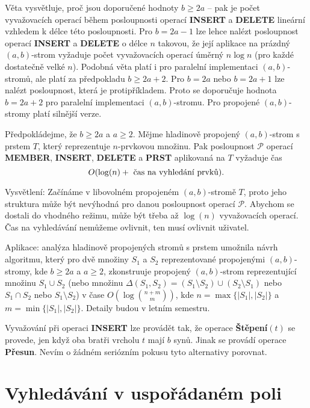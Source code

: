 \documentclass[a4paper,12pt]{article}
\begin{document}
Věta vysvětluje, proč jsou doporučené hodnoty $
b\ge 2a$ -- 
pak je počet vyvažovacích ope\-rací během posloupnosti 
operací {\bf INSERT} a {\bf DELETE} lineární vzhledem k délce 
této posloupnosti. Pro $b=2a-1$ lze lehce nalézt 
posloupnost operací {\bf INSERT} a {\bf DELETE} o délce $n$ takovou, 
že její aplikace na prázdný $(a,b)$-strom vyžaduje počet 
vyvažovacích operací ú\-měrný $n\log n$ (pro každé 
dostatečně velké $n$). Podobná věta platí i pro paralelní 
implementaci $(a,b)$-stromů, ale platí za 
předpokladu $b\ge 2a+2$. Pro $b=2a$ nebo $b=2a+1$ lze 
nalézt posloupnost, která je protipříkladem. Proto se 
doporučuje hodnota $b=2a+2$ pro paralelní implementaci 
$(a,b)$-stromu. Pro propojené $(a,b)$-stromy platí silnější 
verze.

\begin{veta}Předpokládejme, že $b\ge 2a$ a $a\ge 2$. Mějme 
hladinově propojený $(a,b)$-strom s prstem $T$, který reprezentuje 
$n$-prvkovou množinu. Pak posloupnost $\mathcal P$ operací {\bf MEMBER},
{\bf INSERT}, {\bf DELETE} a {\bf PRST} aplikovaná na $T$ vyžaduje čas 
$$O(\log(n)+\text{\rm\ čas na vyhledání prvků})
.$$
\end{veta}

Vysvětlení: Začínáme v libovolném 
propojeném $(a,b)$-stro\-mě $T$, proto jeho struktura 
může být nevýhodná pro danou pos\-loupnost operací $
\mathcal P$. 
Abychom se dostali do vhodného režimu, může 
být třeba až $\log(n)$ vyvažovacích operací. Čas na 
vy\-hledává\-ní nemůžeme ovlivnit, ten musí 
ovlivnit uživatel.

Aplikace: analýza hladinově propojených stromů s prstem 
u\-mož\-nila návrh algoritmu, který pro dvě množiny $
S_1$ a $S_2$ 
repre\-zentované propojenými $(a,b)$-stromy, kde $b\ge 2a$ a 
$a\ge 2$, 
zkonstruuje propojený $(a,b)$-strom reprezentující množinu 
$S_1\cup S_2$ (nebo množinu $\Delta (S_1,S_2)=(S_1\setminus S_
2)\cup (S_2\setminus S_1)$ nebo 
$S_1\cap S_2$ nebo $S_1\setminus S_2$) v čase $O(\log\binom {n
+m}m)$, kde 
$n=\max\{|S_1|,|S_2|\}$ a $m=\min\{|S_1|,|S_2|\}$. Detaily budou v letním 
semestru.

Vyvažování při operaci {\bf INSERT} lze provádět 
tak, že operace {\bf Štěpení$(t)$} se provede, jen když oba 
bratři vrcholu $t$ mají $b$ synů. Jinak se provádí 
operace {\bf Přesun}. Nevím o žádném seriózním pokusu tyto 
alternativy porovnat.   

\section{Vyhledávání v uspořádaném poli}
\end{document}
